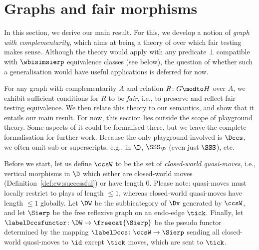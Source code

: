 \documentclass{LMCS}
\theoremstyle{plain}\newtheorem{satz}[thm]{Satz}
\begin{document}
\section{Graphs and fair morphisms}\label{sec:graphs}
In this section, we derive our main result.  For this, we develop a
notion of \emph{graph with complementarity}, which aims at being a
theory of \ltss{} over which fair testing makes sense.  Although the
theory would apply with any predicate $\bot$ compatible with
$\wbisimsierp$ equivalence classes (see below), the question of
whether such a generalisation would have useful applications is
deferred for now.

For any graph with complementarity $A$ and relation $R \colon G \modto
H$ over $A$, we exhibit sufficient conditions for $R$ to be
\emph{fair}, i.e., to preserve and reflect fair testing
equivalence. We then relate this theory to our semantics, and show
that it entails our main result.  For now, this section lies outside
the scope of playground theory. Some aspects of it could be formalised
there, but we leave the complete formalisation for further
work. Because the only playground involved is $\Dccs$, we often omit
sub or superscripts, e.g., in $\D$, $\SSS_{\D}$ (even just $\SSS$),
etc.



Before we start, let us define $\ccsW$ to be the set of
\emph{closed-world quasi-moves}, i.e., vertical morphisms in $\D$
which either are closed-world moves
(Definition~\ref{def:cw:successful}) or have length 0.  
Please note: quasi-moves must locally restrict to plays of length $\leq 1$, whereas
closed-world quasi-moves have length $\leq 1$ globally.
Let $\DW$ be
the subbicategory of $\Dv$ generated by $\ccsW$, and let $\Sierp$ be the
free reflexive graph on an endo-edge $\tick$.  Finally, let
$\labelDccsfunctor \colon \DW \to \freecat{\Sierp}$ be the pseudo functor
determined by the mapping $\labelDccs \colon \ccsW \to \Sierp$ sending all closed-world
quasi-moves to $\id$ except $\tick$ moves, which are sent to $\tick$.
\end{document}
